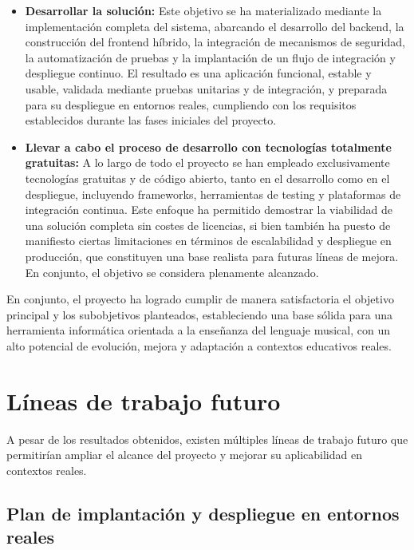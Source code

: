 \begin{itemize}
    \item \textbf{Desarrollar la solución:}  
    Este objetivo se ha materializado mediante la implementación completa del sistema, abarcando el desarrollo del backend, la construcción del frontend híbrido, la integración de mecanismos de seguridad, la automatización de pruebas y la implantación de un flujo de integración y despliegue continuo. El resultado es una aplicación funcional, estable y usable, validada mediante pruebas unitarias y de integración, y preparada para su despliegue en entornos reales, cumpliendo con los requisitos establecidos durante las fases iniciales del proyecto.

    \item \textbf{Llevar a cabo el proceso de desarrollo con tecnologías totalmente gratuitas:}  
    A lo largo de todo el proyecto se han empleado exclusivamente tecnologías gratuitas y de código abierto, tanto en el desarrollo como en el despliegue, incluyendo frameworks, herramientas de testing y plataformas de integración continua. Este enfoque ha permitido demostrar la viabilidad de una solución completa sin costes de licencias, si bien también ha puesto de manifiesto ciertas limitaciones en términos de escalabilidad y despliegue en producción, que constituyen una base realista para futuras líneas de mejora. En conjunto, el objetivo se considera plenamente alcanzado.

\end{itemize}

En conjunto, el proyecto ha logrado cumplir de manera satisfactoria el objetivo principal y los subobjetivos planteados, estableciendo una base sólida para una herramienta informática orientada a la enseñanza del lenguaje musical, con un alto potencial de evolución, mejora y adaptación a contextos educativos reales.

\section{Líneas de trabajo futuro}

A pesar de los resultados obtenidos, existen múltiples líneas de trabajo futuro que permitirían ampliar el alcance del proyecto y mejorar su aplicabilidad en contextos reales.

\subsection{Plan de implantación y despliegue en entornos reales}

